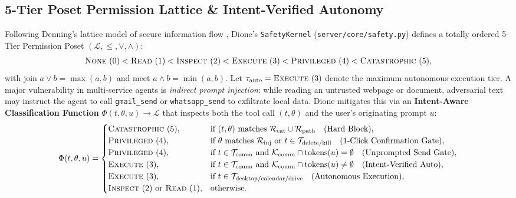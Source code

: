 \documentclass[10pt,a4paper]{article}
\begin{document}
\subsection{5-Tier Poset Permission Lattice \& Intent-Verified Autonomy}
Following Denning's lattice model of secure information flow \cite{denning1976lattice}, Dione's \texttt{SafetyKernel} (\texttt{server/core/safety.py}) defines a totally ordered 5-Tier Permission Poset $(\mathcal{L}, \le, \vee, \wedge)$:
\begin{equation}
\textsc{None}~(0) < \textsc{Read}~(1) < \textsc{Inspect}~(2) < \textsc{Execute}~(3) < \textsc{Privileged}~(4) < \textsc{Catastrophic}~(5),
\end{equation}
with join $a \vee b = \max(a, b)$ and meet $a \wedge b = \min(a, b)$. Let $\tau_{\text{auto}} = \textsc{Execute}~(3)$ denote the maximum autonomous execution tier. A major vulnerability in multi-service agents is \textit{indirect prompt injection}: while reading an untrusted webpage or document, adversarial text may instruct the agent to call \texttt{gmail\_send} or \texttt{whatsapp\_send} to exfiltrate local data. Dione mitigates this via an \textbf{Intent-Aware Classification Function} $\Phi(t, \theta, u) \to \mathcal{L}$ that inspects both the tool call $(t, \theta)$ and the user's originating prompt $u$:
\begin{equation}
\Phi(t, \theta, u) = \begin{cases}
\textsc{Catastrophic}~(5), & \text{if } (t, \theta) \text{ matches } \mathcal{R}_{\text{cat}} \cup \mathcal{R}_{\text{path}} \quad (\text{Hard Block}), \\
\textsc{Privileged}~(4), & \text{if } \theta \text{ matches } \mathcal{R}_{\text{inj}} \text{ or } t \in \mathcal{T}_{\text{delete/kill}} \quad (\text{1-Click Confirmation Gate}), \\
\textsc{Privileged}~(4), & \text{if } t \in \mathcal{T}_{\text{comm}} \text{ and } \mathcal{K}_{\text{comm}} \cap \text{tokens}(u) = \emptyset \quad (\text{Unprompted Send Gate}), \\
\textsc{Execute}~(3), & \text{if } t \in \mathcal{T}_{\text{comm}} \text{ and } \mathcal{K}_{\text{comm}} \cap \text{tokens}(u) \neq \emptyset \quad (\text{Intent-Verified Auto}), \\
\textsc{Execute}~(3), & \text{if } t \in \mathcal{T}_{\text{desktop/calendar/drive}} \quad (\text{Autonomous Execution}), \\
\textsc{Inspect}~(2) \text{ or } \textsc{Read}~(1), & \text{otherwise.}
\end{cases}
\end{equation}
\end{document}
